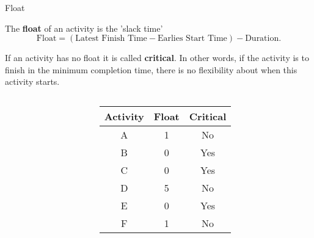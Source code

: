 \documentclass[8pt]{beamer}
\def\height{0.8cm}
\def\width{1.2cm}
\newcommand{\keynode}[6]{\node[minimum height=\height,minimum width=\width,draw,rectangle,color=aa,fill=cc] (#3) at (#1,#2) {};
	\node[rectangle,minimum height=\height/2,minimum width=\width,above,color=aa,fill=cc] at (#3) {#3};
	\node[draw,rectangle,minimum height=\height/2,minimum width=\width/3,below,color=aa,fill=cc,inner sep =0cm] at (#3) {\footnotesize#4};
	\node[draw,rectangle,minimum height=\height/2,minimum width=\width/3,below,xshift=\height/2,color=aa,fill=cc,inner sep=0cm] at (#3) {\footnotesize#5};
	\node[draw,rectangle,minimum height=\height/2,minimum width=\width/3,below,xshift=-\height/2,color=aa,fill=cc,inner sep=0cm] at (#3) {\footnotesize#6}; }
\begin{document}
\begin{frame}[allowframebreaks]{Float}
\begin{definition}
	The \textbf{float} of an activity is the 'slack time'
	\[
		\text{Float} = (\text{Latest Finish Time} - \text{Earlies Start Time}) - \text{Duration}
	.\] 
	
\end{definition}	

\begin{definition}
	If an activity has no float it is called \textbf{critical}. In other words, if the activity is to finish in the minimum completion time, there is no flexibility about when this activity starts.
	
\end{definition}

\begin{columns}
	\begin{column}{0.6\textwidth}

\begin{center}
\end{center}



		
	\end{column}
	\begin{column}{0.4\textwidth}
		

\begin{center}
	\colorbox{cc!30}{
		\setlength\arrayrulewidth{0.5mm}
		\begin{tabular}{ccc}
			Activity & Float & Critical \\
			\hline
			A &  1 & No \\
			B &  0 & Yes \\
			C &  0 & Yes \\
			D &  5 & No \\
			E &  0 & Yes \\
			F &  1 & No \\
		\end{tabular}
	}
	

\end{center}
\end{column}
\end{columns}
\end{frame}
\end{document}
